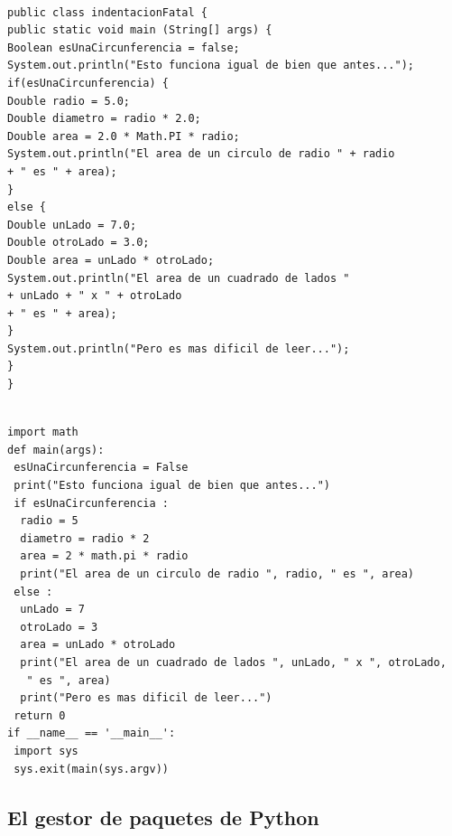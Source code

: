\documentclass[spanish,12pt,a4paper,final,oneside]{book}
\begin{document}
\begin{lstlisting}[frame=single, caption=lenguaje Java : indentación lo peor posible]

public class indentacionFatal {
public static void main (String[] args) {
Boolean esUnaCircunferencia = false;
System.out.println("Esto funciona igual de bien que antes...");
if(esUnaCircunferencia) {
Double radio = 5.0;
Double diametro = radio * 2.0;
Double area = 2.0 * Math.PI * radio;
System.out.println("El area de un circulo de radio " + radio 
+ " es " + area);
}
else {
Double unLado = 7.0;
Double otroLado = 3.0;
Double area = unLado * otroLado;
System.out.println("El area de un cuadrado de lados "
+ unLado + " x " + otroLado 
+ " es " + area);
}
System.out.println("Pero es mas dificil de leer...");
}
}
\end{lstlisting}


\begin{lstlisting}[frame=single, caption=lenguaje Python : indentación lo peor posible]

import math
def main(args):
 esUnaCircunferencia = False
 print("Esto funciona igual de bien que antes...")
 if esUnaCircunferencia :
  radio = 5
  diametro = radio * 2
  area = 2 * math.pi * radio
  print("El area de un circulo de radio ", radio, " es ", area)
 else :
  unLado = 7
  otroLado = 3
  area = unLado * otroLado
  print("El area de un cuadrado de lados ", unLado, " x ", otroLado, 
   " es ", area)
  print("Pero es mas dificil de leer...")
 return 0
if __name__ == '__main__':
 import sys
 sys.exit(main(sys.argv))

\end{lstlisting}


\subsection{El gestor de paquetes de Python}
\end{document}
